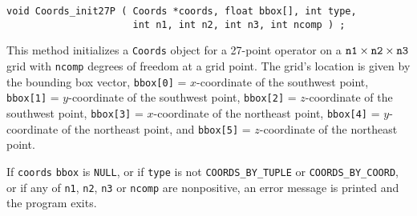 \begin{enumerate}
\begin{verbatim}
void Coords_init27P ( Coords *coords, float bbox[], int type, 
                      int n1, int n2, int n3, int ncomp ) ;
\end{verbatim}
This method initializes a {\tt Coords} object for a 27-point
operator on a $\mbox{\tt n1} \times \mbox{\tt n2} \times {\tt n3}$ 
grid with {\tt ncomp} degrees of freedom at a grid point.
The grid's location is given by the bounding box vector,
{\tt bbox[0]} = $x$-coordinate of the southwest point,
{\tt bbox[1]} = $y$-coordinate of the southwest point,
{\tt bbox[2]} = $z$-coordinate of the southwest point,
{\tt bbox[3]} = $x$-coordinate of the northeast point,
{\tt bbox[4]} = $y$-coordinate of the northeast point, and
{\tt bbox[5]} = $z$-coordinate of the northeast point.
\par {}
If {\tt coords} {\tt bbox} is {\tt NULL},
or if {\tt type} is not 
{\tt COORDS\_BY\_TUPLE} or {\tt COORDS\_BY\_COORD},
or if any of {\tt n1}, {\tt n2}, {\tt n3} 
or {\tt ncomp} are nonpositive,
an error message is printed and the program exits.
\end{enumerate}
\par
